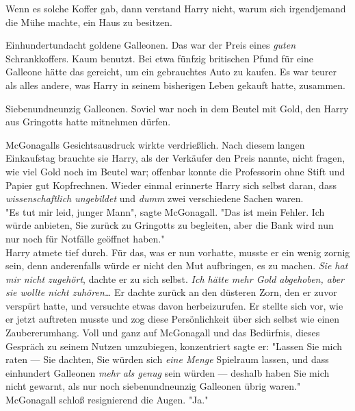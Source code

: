 {Wenn es solche Koffer gab, dann verstand Harry nicht, warum sich irgendjemand die Mühe machte, ein Haus zu besitzen.

Einhundertundacht goldene Galleonen. Das war der Preis eines \emph{guten} Schrankkoffers. Kaum benutzt. Bei etwa fünfzig britischen Pfund für eine Galleone hätte das gereicht, um ein gebrauchtes Auto zu kaufen. Es war teurer als alles andere, was Harry in seinem bisherigen Leben gekauft hatte, zusammen.

Siebenundneunzig Galleonen. Soviel war noch in dem Beutel mit Gold, den Harry aus Gringotts hatte mitnehmen dürfen.

McGonagalls Gesichtsausdruck wirkte verdrießlich. Nach diesem langen Einkaufstag brauchte sie Harry, als der Verkäufer den Preis nannte, nicht fragen, wie viel Gold noch im Beutel war; offenbar konnte die Professorin ohne Stift und Papier gut Kopfrechnen. Wieder einmal erinnerte Harry sich selbst daran, dass \emph{wissenschaftlich ungebildet} und \emph{dumm} zwei verschiedene Sachen waren.\\ "Es tut mir leid, junger Mann", sagte McGonagall. "Das ist mein Fehler. Ich würde anbieten, Sie zurück zu Gringotts zu begleiten, aber die Bank wird nun nur noch für Notfälle geöffnet haben."\\ Harry atmete tief durch. Für das, was er nun vorhatte, musste er ein wenig zornig sein, denn anderenfalls würde er nicht den Mut aufbringen, es zu machen. \emph{Sie hat mir nicht zugehört}, dachte er zu sich selbst. \emph{Ich hätte mehr Gold abgehoben, aber sie wollte nicht zuhören…} Er dachte zurück an den düsteren Zorn, den er zuvor verspürt hatte, und versuchte etwas davon herbeizurufen. Er stellte sich vor, wie er jetzt auftreten musste und zog diese Persönlichkeit über sich selbst wie einen Zaubererumhang. Voll und ganz auf McGonagall und das Bedürfnis, dieses Gespräch zu seinem Nutzen umzubiegen, konzentriert sagte er: "Lassen Sie mich raten --- Sie dachten, Sie würden sich \emph{eine Menge} Spielraum lassen, und dass einhundert Galleonen \emph{mehr als genug} sein würden --- deshalb haben Sie mich nicht gewarnt, als nur noch siebenundneunzig Galleonen übrig waren."\\ McGonagall schloß resignierend die Augen. "Ja."

}
